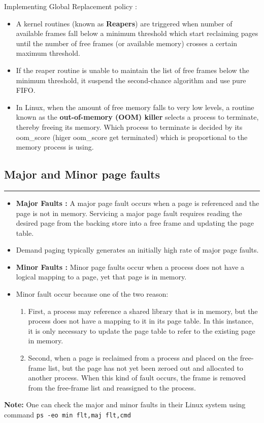 \documentclass[12pt,onecolumn]{IEEEtran}
\begin{document}
Implementing Global Replacement policy :
\begin{itemize}
	\item A kernel routines (known as \textbf{Reapers}) are triggered  when number of available frames fall below a minimum threshold which start reclaiming pages until the number of free frames (or available memory) crosses a certain maximum threshold.
	\begin{center}
	\end{center}
	\item If the reaper routine is unable to maintain the list of free frames below the minimum threshold, it suspend the second-chance algorithm and use pure FIFO.
	\item In Linux, when the amount of free memory falls to very low levels, a routine known as the \textbf{out-of-memory (OOM) killer} selects a process to terminate, thereby freeing its memory. Which process to terminate is decided by its oom\_score (higer oom\_score get terminated) which is proportional to the memory process is using.
\end{itemize}

\subsection{Major and Minor page faults}
\hrule
\vspace{3mm}

\begin{itemize}
	\item \textbf{Major Faults :} A major page fault occurs when a page is referenced and the
	page is not in memory. Servicing a major page fault requires reading the
	desired page from the backing store into a free frame and updating the page
	table.
	\item Demand paging typically generates an initially high rate of major page
	faults.
	\item \textbf{Minor Faults :} Minor page faults occur when a process does not have a logical mapping
	to a page, yet that page is in memory.
	\item Minor fault occur because one of the two reason:
	\begin{enumerate}
		\item First, a process may reference a shared library that is in memory, but
		the process does not have a mapping to it in its page table. In this instance,
		it is only necessary to update the page table to refer to the existing page in
		memory.
		\item Second, when a page is reclaimed
		from a process and placed on the free-frame list, but the page has not yet
		been zeroed out and allocated to another process. When this kind of fault
		occurs, the frame is removed from the free-frame list and reassigned to the
		process.
	\end{enumerate}
\end{itemize}
\textbf{Note: }One can check the major and minor faults in their Linux system using command \texttt{ps -eo min flt,maj flt,cmd}
\end{document}
